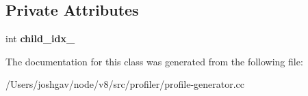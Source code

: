 \subsection*{Private Attributes}
\begin{DoxyCompactItemize}
\item 
int {\bfseries child\+\_\+idx\+\_\+}\hypertarget{classv8_1_1internal_1_1_position_a1f9f5deb40da76e3ccf3daa3336a2eee}{}\label{classv8_1_1internal_1_1_position_a1f9f5deb40da76e3ccf3daa3336a2eee}

\end{DoxyCompactItemize}


The documentation for this class was generated from the following file\+:\begin{DoxyCompactItemize}
\item 
/\+Users/joshgav/node/v8/src/profiler/profile-\/generator.\+cc\end{DoxyCompactItemize}
